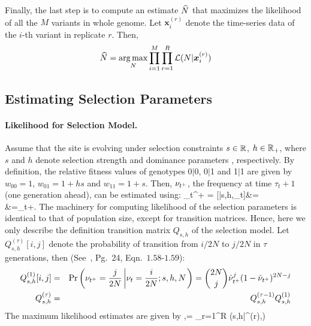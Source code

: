 Finally, the last step is to compute an estimate $\widehat{N}$ that maximizes
the likelihood of all the $M$ variants in whole genome. Let
$\bm{x}_i^{(r)}$ denote the time-series data of the $i$-th variant in
replicate $r$. Then,
\begin{equation}
 \widehat{N} =
\underset{N}{\arg \max} \prod_{i=1}^M  \prod_{r=1}^R{\cal L}(N|\bm{x}_i^{(r)})
\label{eq:mlen}
\end{equation}

\subsection{Estimating Selection Parameters}

\paragraph{Likelihood for Selection Model.}
Assume that the site is evolving under selection constraints $s\in
{\mathbb R}$, $h\in {\mathbb R}_+$, where $s$ and $h$ denote selection strength and 
dominance parameters ,
respectively. By definition, the relative fitness values of genotypes
0$|$0, 0$|$1 and 1$|$1 are given by $w_{00}=1$, $w_{01}=1+hs$ and
$w_{11}=1+s$.  Then, $\nu_{t^+}$, the frequency at time
$\tau_{t}+1$ (one generation ahead), can be estimated using: 
\beq 
\hat{\nu}_{t^+} =
[\nusp|s,h,\nu_t]&=\\
&=\nu_t+.
  \label{eq:transition}
\eeq
The machinery for computing likelihood of the selection parameters is 
identical to that of population size, except for transition matrices. Hence, here 
we only describe the definition transition matrix $Q_{s,h}$ of the selection 
model.
Let $Q^{(\tau)}_{s,h}[i,j]$ denote the
probability of transition from ${i}/{2N}$ to ${j}/{2N}$ in
$\tau$ generations, then (See~\cite{Ewens2012Mathematical}, Pg.~24, 
Eqn.~$1.58$-$1.59$):
\begin{eqnarray}
  Q^{(1)}_{s,h}[i,j] &=& \operatorname{Pr}\left(\nu_{t^+}=\frac{j}{2N} \left\lvert
      \nu_{t}=\frac{i}{2N};s,h,N \right .\right)={2N \choose j}
  \hat{\nu}_{t^+}^{j} (1-\hat{\nu}_{t^+})^{2N-j}\label{eq:Q1}\\
  Q^{(\tau)}_{s,h} &=& Q^{(\tau-1)}_{s,h}Q^{(1)}_{s,h}\label{eq:Qt}
  \label{eq:mkvs}   
\end{eqnarray}
The maximum likelihood estimates are given by
\beq
\hs,\hh =  \prod_{r=1}^R \Lc(s,h|^{(r)},\hN) 
\label{eq:mlesh}
\eeq

